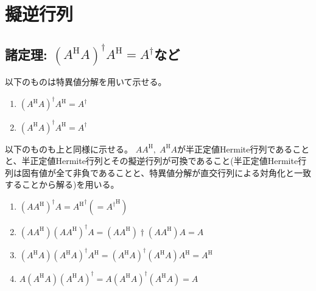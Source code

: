 \chapter{擬逆行列}
    \section{諸定理: \texorpdfstring{$(A^\mathrm{H}A)^\dagger A^\mathrm{H} = A^\dagger$}{(A\string^H A)\string^† A\string^H = A\string^†}など}
        以下のものは特異値分解を用いて示せる。
        \begin{enumerate}
            \item $(A^\mathrm{H}A)^\dagger A^\mathrm{H} = A^\dagger$
            \item $(A^\mathrm{H}A)^\dagger A^\mathrm{H} = A^\dagger$ \label{foo}
        \end{enumerate}
        以下のものも上と同様に示せる。
        $AA^\mathrm{H},\;A^\mathrm{H}A$が半正定値Hermite行列であることと、半正定値Hermite行列とその擬逆行列が可換であること(半正定値Hermite行列は固有値が全て非負であることと、特異値分解が直交行列による対角化と一致することから解る)を用いる。
        \begin{enumerate}
            \item $(AA^\mathrm{H})^\dagger A = {A^\mathrm{H}}^\dagger (= {A^\dagger}^\mathrm{H})$
            \item $(AA^\mathrm{H})(AA^\mathrm{H})^\dagger A = (AA^\mathrm{H})\dagger(AA^\mathrm{H})A = A$
            \item $(A^\mathrm{H}A)(A^\mathrm{H}A)^\dagger A^\mathrm{H} = (A^\mathrm{H}A)^\dagger(A^\mathrm{H}A)A^\mathrm{H} = A^\mathrm{H}$
            \item $A(A^\mathrm{H}A)(A^\mathrm{H}A)^\dagger = A(A^\mathrm{H}A)^\dagger(A^\mathrm{H}A) = A$
        \end{enumerate}
